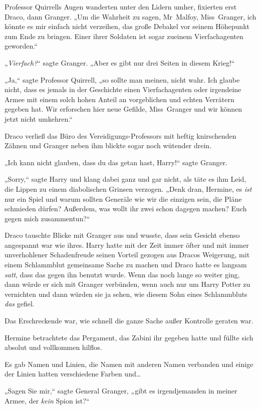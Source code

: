 {Professor Quirrells Augen wanderten unter den Lidern umher, fixierten erst Draco, dann Granger. „Um die Wahrheit zu sagen, Mr~Malfoy, Miss~Granger, ich könnte es mir einfach nicht verzeihen, das große Debakel vor seinem Höhepunkt zum Ende zu bringen. Einer ihrer Soldaten ist sogar zueinem Vierfachagenten geworden.“

„\emph{Vierfach?}“ sagte Granger. „Aber es gibt nur drei Seiten in diesem Krieg!“

„Ja,“ sagte Professor Quirrell, „so sollte man meinen, nicht wahr. Ich glaube nicht, dass es jemals in der Geschichte einen Vierfachagenten oder irgendeine Armee mit einem solch hohen Anteil an vorgeblichen und echten Verrätern gegeben hat. Wir erforschen hier neue Gefilde, Miss~Granger und wir können jetzt nicht umkehren.“

Draco verließ das Büro des Vereidigungs-Professors mit heftig knirschenden Zähnen und Granger neben ihm blickte sogar noch wütender drein.

„Ich kann nicht glauben, dass du das getan hast, Harry!“ sagte Granger.

„Sorry,“ sagte Harry und klang dabei ganz und gar nicht, als täte es ihm Leid, die Lippen zu einem diabolischen Grinsen verzogen. „Denk dran, Hermine, es \emph{ist} nur ein Spiel und warum sollten Generäle wie wir die einzigen sein, die Pläne schmieden dürfen? Außerdem, was wollt ihr zwei schon dagegen machen? Euch gegen mich zusammentun?“

Draco tauschte Blicke mit Granger aus und wusste, dass sein Gesicht ebenso angespannt war wie ihres. Harry hatte mit der Zeit immer öfter und mit immer unverhohlener Schadenfreude seinen Vorteil gezogen aus Dracos Weigerung, mit einem Schlammblut gemeinsame Sache zu machen und Draco hatte es langsam \emph{satt}, dass das gegen ihn benutzt wurde. Wenn das noch lange so weiter ging, dann würde er sich mit Granger verbünden, wenn auch nur um Harry Potter zu vernichten und dann würden sie ja sehen, wie diesem Sohn eines Schlammbluts \emph{das} gefiel.

\later

Das Erschreckende war, wie schnell die ganze Sache außer Kontrolle geraten war.

Hermine betrachtete das Pergament, das Zabini ihr gegeben hatte und füllte sich absolut und vollkommen hilflos.

Es gab Namen und Linien, die Namen mit anderen Namen verbanden und einige der Linien hatten verschiedene Farben und…

„Sagen Sie mir,“ sagte General Granger, „gibt es irgendjemanden in meiner Armee, der \emph{kein} Spion ist?“

}
